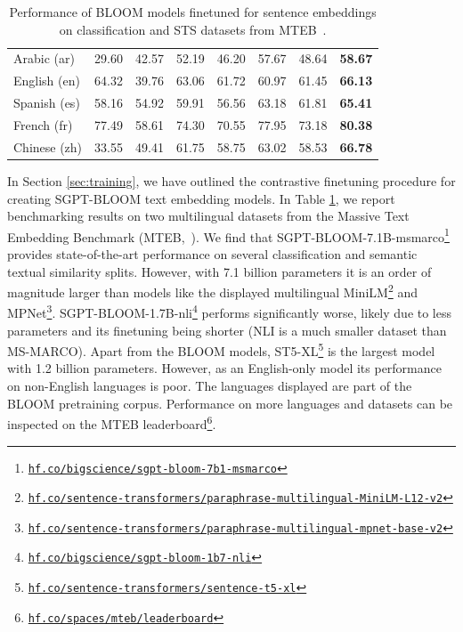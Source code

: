\documentclass[twoside,11pt]{article}
\begin{document}
\begin{table}[th!]
{\begin{tabular}{lccccccc}
\midrule
Arabic (ar) & 29.60 & 42.57 & 52.19 & 46.20 & 57.67 & 48.64 & \textbf{58.67} \\
English (en) & 64.32 & 39.76 & 63.06 & 61.72 & 60.97 & 61.45 & \textbf{66.13} \\
Spanish (es) & 58.16 & 54.92 & 59.91 & 56.56 & 63.18 & 61.81 & \textbf{65.41} \\
French (fr) & 77.49 & 58.61 & 74.30 & 70.55 & 77.95 & 73.18 & \textbf{80.38} \\
Chinese (zh) & 33.55 & 49.41 & 61.75 & 58.75 & 63.02 & 58.53 & \textbf{66.78} \\
\bottomrule
\end{tabular}}
\caption{Performance of BLOOM models finetuned for sentence embeddings on classification and STS datasets from MTEB~\citep{muennighoff2022crosslingual}.}
\label{tab:bloom:emb}
\end{table}

In Section \ref{sec:training}, we have outlined the contrastive finetuning procedure for creating SGPT-BLOOM text embedding models. In Table \ref{tab:bloom:emb}, we report benchmarking results on two multilingual datasets from the Massive Text Embedding Benchmark (MTEB,~\citealp{muennighoff2022mteb}). We find that SGPT-BLOOM-7.1B-msmarco\footnote{\href{https://hf.co/bigscience/sgpt-bloom-7b1-msmarco}{\texttt{hf.co/bigscience/sgpt-bloom-7b1-msmarco}}} provides state-of-the-art performance on several classification and semantic textual similarity splits. However, with 7.1 billion parameters it is an order of magnitude larger than models like the displayed multilingual MiniLM\footnote{\href{https://hf.co/sentence-transformers/paraphrase-multilingual-MiniLM-L12-v2}{\texttt{hf.co/sentence-transformers/paraphrase-multilingual-MiniLM-L12-v2}}} and MPNet\footnote{\href{https://hf.co/sentence-transformers/paraphrase-multilingual-mpnet-base-v2}{\texttt{hf.co/sentence-transformers/paraphrase-multilingual-mpnet-base-v2}}}. SGPT-BLOOM-1.7B-nli\footnote{\href{https://hf.co/bigscience-data/sgpt-bloom-1b7-nli}{\texttt{hf.co/bigscience/sgpt-bloom-1b7-nli}}} performs significantly worse, likely due to less parameters and its finetuning being shorter (NLI is a much smaller dataset than MS-MARCO). Apart from the BLOOM models, ST5-XL\footnote{\href{https://hf.co/sentence-transformers/sentence-t5-xl}{\texttt{hf.co/sentence-transformers/sentence-t5-xl}}} is the largest model with 1.2 billion parameters. However, as an English-only model its performance on non-English languages is poor. The languages displayed are part of the BLOOM pretraining corpus. Performance on more languages and datasets can be inspected on the MTEB leaderboard\footnote{\href{https://hf.co/spaces/mteb/leaderboard}{\texttt{hf.co/spaces/mteb/leaderboard}}}.
\end{document}
